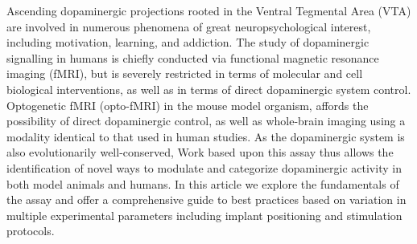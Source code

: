 Ascending dopaminergic projections rooted in the Ventral Tegmental Area (VTA) are involved in numerous phenomena of great neuropsychological interest, including motivation, learning, and addiction.
The study of dopaminergic signalling in humans is chiefly conducted via functional magnetic resonance imaging (fMRI), but is severely restricted in terms of molecular and cell biological interventions, as well as in terms of direct dopaminergic system control.
Optogenetic fMRI (opto-fMRI) in the mouse model organism, affords the possibility of direct dopaminergic control, as well as whole-brain imaging using a modality identical to that used in human studies.
As the dopaminergic system is also evolutionarily well-conserved, Work based upon this assay thus allows the identification of novel ways to modulate and categorize dopaminergic activity in both model animals and humans.
In this article we explore the fundamentals of the assay and offer a comprehensive guide to best practices based on variation in multiple experimental parameters including implant positioning and stimulation protocols.
